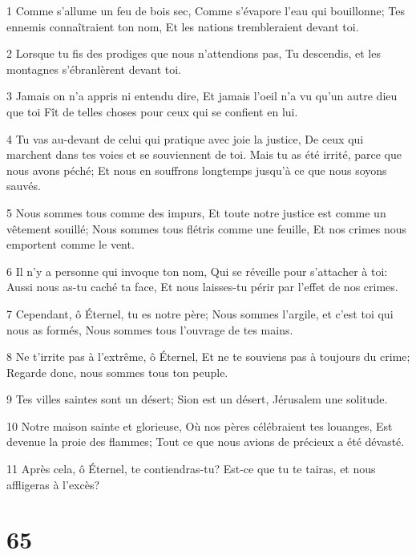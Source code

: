 \par 1 Comme s'allume un feu de bois sec, Comme s'évapore l'eau qui bouillonne; Tes ennemis connaîtraient ton nom, Et les nations trembleraient devant toi.
\par 2 Lorsque tu fis des prodiges que nous n'attendions pas, Tu descendis, et les montagnes s'ébranlèrent devant toi.
\par 3 Jamais on n'a appris ni entendu dire, Et jamais l'oeil n'a vu qu'un autre dieu que toi Fît de telles choses pour ceux qui se confient en lui.
\par 4 Tu vas au-devant de celui qui pratique avec joie la justice, De ceux qui marchent dans tes voies et se souviennent de toi. Mais tu as été irrité, parce que nous avons péché; Et nous en souffrons longtemps jusqu'à ce que nous soyons sauvés.
\par 5 Nous sommes tous comme des impurs, Et toute notre justice est comme un vêtement souillé; Nous sommes tous flétris comme une feuille, Et nos crimes nous emportent comme le vent.
\par 6 Il n'y a personne qui invoque ton nom, Qui se réveille pour s'attacher à toi: Aussi nous as-tu caché ta face, Et nous laisses-tu périr par l'effet de nos crimes.
\par 7 Cependant, ô Éternel, tu es notre père; Nous sommes l'argile, et c'est toi qui nous as formés, Nous sommes tous l'ouvrage de tes mains.
\par 8 Ne t'irrite pas à l'extrême, ô Éternel, Et ne te souviens pas à toujours du crime; Regarde donc, nous sommes tous ton peuple.
\par 9 Tes villes saintes sont un désert; Sion est un désert, Jérusalem une solitude.
\par 10 Notre maison sainte et glorieuse, Où nos pères célébraient tes louanges, Est devenue la proie des flammes; Tout ce que nous avions de précieux a été dévasté.
\par 11 Après cela, ô Éternel, te contiendras-tu? Est-ce que tu te tairas, et nous affligeras à l'excès?

\chapter{65}

